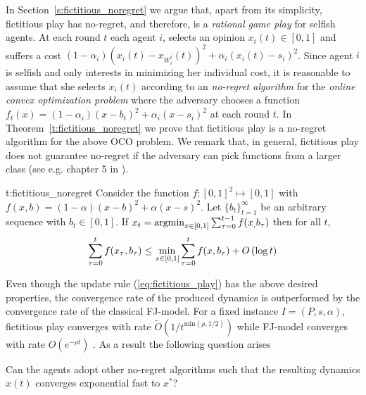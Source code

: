 In Section~\ref{s:fictitious_noregret} we argue that, apart from its simplicity,
fictitious play has no-regret, and therefore,
is a \emph{rational game play} for selfish agents.
At each round $t$ each agent $i$, selects an opinion $x_i(t) \in [0,1]$
and suffers a cost $(1-\alpha_i)(x_i(t)-x_{W_i^t}(t))^2 + \alpha_i(x_i(t)-s_i)^2$.
Since agent $i$ is selfish and only interests in minimizing her individual cost,
it is reasonable to assume that she selects $x_i(t)$ according to
an \emph{no-regret algorithm}
for the \emph{online convex optimization problem} where the adversary chooses
a function $f_t(x)=(1-\alpha_i)(x-b_t)^2 + \alpha_i(x-s_i)^2$ at each round $t$.
In Theorem~\ref{t:fictitious_noregret} we prove that fictitious play is a
no-regret algorithm for the above OCO problem.  We remark that, in general,
fictitious play does not guarantee no-regret if the adversary can pick
functions from a larger class (see e.g. chapter 5 in \cite{Haz16}).

\begin{reptheorem}{t:fictitious_noregret}
  Consider the function $f:[0,1]^2 \mapsto [0,1]$ with
  $f(x,b) = (1-\alpha)(x-b)^2 + \alpha(x-s)^2$.
  Let $\{b_t\}_{t=1}^\infty$ be an arbitrary sequence with
  $b_t \in [0,1]$. If $x_t = \operatorname*{argmin}_{x \in [0,1]}\sum_{\tau=0}^{t-1}f(x_,b_\tau)$
  then for all $t$,
  \[
    \sum_{\tau=0}^{t}f(x_\tau,b_\tau) \leq
    \min_{x \in [0,1]}\sum_{\tau=0}^tf(x,b_\tau) + O\left(\log t\right)
  \]
\end{reptheorem}

Even though the update rule (\ref{eq:fictitious_play}) has the above
desired properties, the convergence rate of the produced dynamics is
outperformed by the convergence rate of the classical FJ-model. For
a fixed instance $I=(P,s,\alpha)$, fictitious play converges with rate
$\widetilde{O}(1/t^{\text{min}(\rho,1/2)})$ while FJ-model
converges with rate $O(e^{-\rho t})$ \cite{GS14}.
As a result the following question arises
\begin{question}
  Can the agents adopt other no-regret algorithms such that the resulting
  dynamics $x(t)$ converges exponential fast to $x^*$?
\end{question}

